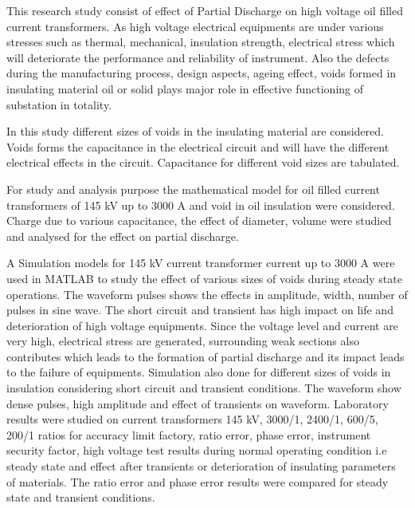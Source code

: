 This research study consist of effect of Partial Discharge on high voltage oil filled current transformers. As high voltage electrical equipments are under various stresses such as thermal, mechanical, insulation strength, electrical stress which will deteriorate the performance and reliability of instrument. Also the defects during the manufacturing process, design aspects, ageing effect, voids formed in insulating material oil or solid plays major role in effective functioning of substation in totality.

In this study different sizes of voids in the insulating material are considered. Voids forms the capacitance in the electrical circuit and will have the different electrical effects in the circuit. Capacitance for different void sizes are tabulated.

For study and analysis purpose the mathematical model for oil filled current transformers of 145 kV up to 3000 A and void in oil insulation were considered. Charge due to various capacitance, the effect of diameter, volume were studied and analysed for the effect on partial discharge. 

A Simulation models for 145 kV current transformer current up to 3000 A were used in MATLAB to study the effect of various sizes of voids during steady state operations. The waveform pulses shows the effects in amplitude, width, number of pulses in sine wave. The short circuit and transient has high impact on life and deterioration of high voltage equipments. Since the voltage level and current are very high, electrical stress are generated, surrounding weak sections also contributes which leads to the formation of partial discharge and its impact leads to the failure of equipments. Simulation also done for different sizes of voids in insulation considering short circuit and transient conditions. The waveform show dense pulses, high amplitude and effect of transients on waveform. Laboratory results were studied on current transformers 145 kV, 3000/1, 2400/1, 600/5, 200/1 ratios for accuracy limit factory, ratio error, phase error, instrument security factor, high voltage test results during normal operating condition i.e steady state and effect after transients or deterioration of insulating parameters of materials. The ratio error and phase error results were compared for steady state and transient conditions. 
